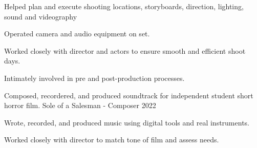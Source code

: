 \begin{cventries}
{\begin{cvitems}
\item {Helped plan and execute shooting locations, storyboards, direction, lighting, sound and videography}
\item {Operated camera and audio equipment on set.}
\item {Worked closely with director and actors to ensure smooth and efficient shoot days.}
\item {Intimately involved in pre and post-production processes.}
\end{cvitems}
}\cventry
{Composed, recordered, and produced soundtrack for independent student short horror film.}
{Sole of a Salesman - Composer}
{}
{2022}
{
\begin{cvitems}
\item {Wrote, recorded, and produced music using digital tools and real instruments.}
\item {Worked closely with director to match tone of film and assess needs.}
\end{cvitems}
}
\end{cventries}